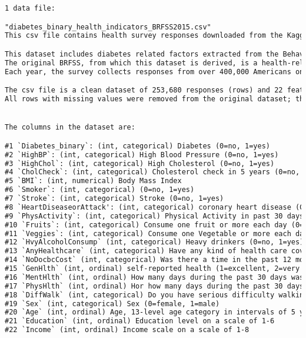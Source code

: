 \documentclass[12pt]{article}
\begin{document}
\begin{lstlisting}[language=TeX]
1 data file:

"diabetes_binary_health_indicators_BRFSS2015.csv"
This csv file contains health survey responses downloaded from the Kaggle's Diabetes Health Indicators Dataset.

This dataset includes diabetes related factors extracted from the Behavioral Risk Factor Surveillance System 2015 (BRFSS, 2015).
The original BRFSS, from which this dataset is derived, is a health-related telephone survey that is collected annually by the CDC.
Each year, the survey collects responses from over 400,000 Americans on health-related risk behaviors, chronic health conditions, and the use of preventative services. These features are either questions directly asked of participants, or calculated variables based on individual participant responses.

The csv file is a clean dataset of 253,680 responses (rows) and 22 features (columns).
All rows with missing values were removed from the original dataset; the current file contains no missing values.


The columns in the dataset are:

#1 `Diabetes_binary`: (int, categorical) Diabetes (0=no, 1=yes)
#2 `HighBP`: (int, categorical) High Blood Pressure (0=no, 1=yes)
#3 `HighChol`: (int, categorical) High Cholesterol (0=no, 1=yes)
#4 `CholCheck`: (int, categorical) Cholesterol check in 5 years (0=no, 1=yes)
#5 `BMI`: (int, numerical) Body Mass Index
#6 `Smoker`: (int, categorical) (0=no, 1=yes)
#7 `Stroke`: (int, categorical) Stroke (0=no, 1=yes)
#8 `HeartDiseaseorAttack': (int, categorical) coronary heart disease (CHD) or myocardial infarction (MI), (0=no, 1=yes)
#9 `PhysActivity`: (int, categorical) Physical Activity in past 30 days (0=no, 1=yes)
#10 `Fruits`: (int, categorical) Consume one fruit or more each day (0=no, 1=yes)
#11 `Veggies`: (int, categorical) Consume one Vegetable or more each day (0=no, 1=yes)
#12 `HvyAlcoholConsump` (int, categorical) Heavy drinkers (0=no, 1=yes)
#13 `AnyHealthcare` (int, categorical) Have any kind of health care coverage (0=no, 1=yes)
#14 `NoDocbcCost` (int, categorical) Was there a time in the past 12 months when you needed to see a doctor but could not because of cost? (0=no, 1=yes)
#15 `GenHlth` (int, ordinal) self-reported health (1=excellent, 2=very good, 3=good, 4=fair, 5=poor)
#16 `MentHlth` (int, ordinal) How many days during the past 30 days was your mental health not good? (1-30 days)
#17 `PhysHlth` (int, ordinal) Hor how many days during the past 30 days was your physical health not good? (1-30 days)
#18 `DiffWalk` (int, categorical) Do you have serious difficulty walking or climbing stairs? (0=no, 1=yes)
#19 `Sex` (int, categorical) Sex (0=female, 1=male)
#20 `Age` (int, ordinal) Age, 13-level age category in intervals of 5 years (1=18-24, 2=25-29, ..., 12=75-79, 13=80 or older)
#21 `Education` (int, ordinal) Education level on a scale of 1-6
#22 `Income` (int, ordinal) Income scale on a scale of 1-8


\end{lstlisting}
\end{document}
